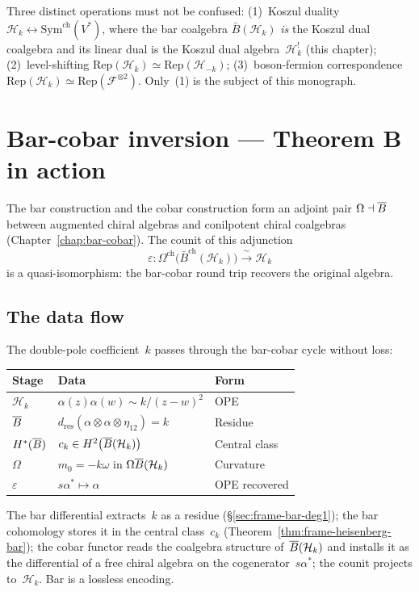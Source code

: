 \begin{remark}
\label{rem:frame-three-dualities}
Three distinct operations must not be confused: (1)~Koszul duality $\mathcal{H}_k \leftrightarrow \mathrm{Sym}^{\mathrm{ch}}(V^*)$, where the bar coalgebra $\bar{B}(\mathcal{H}_k)$ \emph{is} the Koszul dual coalgebra and its linear dual is the Koszul dual algebra~$\mathcal{H}_k^!$ (this chapter); (2)~level-shifting $\mathrm{Rep}(\mathcal{H}_k) \simeq \mathrm{Rep}(\mathcal{H}_{-k})$; (3)~boson-fermion correspondence $\mathrm{Rep}(\mathcal{H}_k) \simeq \mathrm{Rep}(\mathcal{F}^{\otimes 2})$.  Only~(1) is the subject of this monograph.
\end{remark}

\section{Bar-cobar inversion --- Theorem B in action}
\label{sec:frame-inversion}

The bar construction and the cobar construction form an adjoint
pair $\Omega \dashv \overline{B}$ between augmented chiral algebras
and conilpotent chiral coalgebras
(Chapter~\ref{chap:bar-cobar}).  The counit of this adjunction
\begin{equation}\label{eq:frame-bar-cobar-inversion}
\varepsilon\colon
\Omega^{\mathrm{ch}}\bigl(\bar{B}^{\mathrm{ch}}(\mathcal{H}_k)\bigr)
\xrightarrow{\;\sim\;} \mathcal{H}_k
\end{equation}
is a quasi-isomorphism: the bar-cobar round trip recovers the
original algebra.

\subsection{The data flow}

The double-pole coefficient~$k$ passes through the bar-cobar
cycle without loss:
\begin{center}
\small
\renewcommand{\arraystretch}{1.3}
\begin{tabular}{@{}lll@{}}
\textbf{Stage} & \textbf{Data} & \textbf{Form} \\
\hline
$\mathcal{H}_k$ &
  $\alpha(z)\alpha(w) \sim k/(z{-}w)^2$ &
  OPE \\
$\overline{B}$ &
  $d_{\mathrm{res}}(\alpha{\otimes}\alpha{\otimes}\eta_{12})
  = k$ &
  Residue \\
$H^*(\overline{B})$ &
  $c_k \in H^2\bigl(\overline{B}(\mathcal{H}_k)\bigr)$ &
  Central class \\
$\Omega$ &
  $m_0 = -k\omega$ in $\Omega\overline{B}(\mathcal{H}_k)$ &
  Curvature \\
$\varepsilon$ &
  $s\alpha^* \mapsto \alpha$ &
  OPE recovered
\end{tabular}
\end{center}
\noindent
The bar differential extracts~$k$ as a residue
(\S\ref{sec:frame-bar-deg1}); the bar cohomology stores it
in the central class~$c_k$
(Theorem~\ref{thm:frame-heisenberg-bar}); the cobar functor
reads the coalgebra structure of~$\overline{B}(\mathcal{H}_k)$
and installs it as the differential of a free chiral
algebra on the cogenerator~$s\alpha^*$; the counit projects
to~$\mathcal{H}_k$.  Bar is a lossless encoding.

